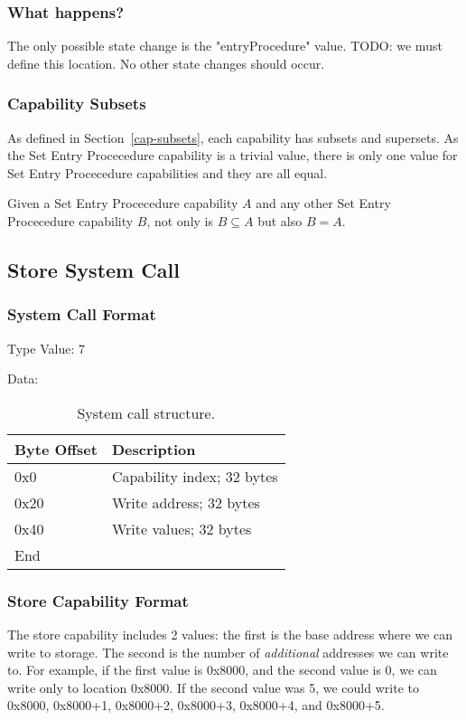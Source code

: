 \documentclass[english,a4paper]{article}
\let\oldparagraph\subsubsection
\renewcommand{\subsubsection}[1]{\oldparagraph{#1}\mbox{}}
\begin{document}
\subsubsection{What happens?}
The only possible state change is the "entryProcedure" value. TODO: we must
define this location. No other state changes should occur.

\subsubsection{Capability Subsets}
As defined in Section~\ref{cap-subsets}, each capability has subsets and
supersets. As the Set Entry Procecedure capability is a trivial value, there is
only one value for Set Entry Procecedure capabilities and they are all equal.

Given a Set Entry Procecedure capability $A$ and any other Set Entry Procecedure
capability $B$, not only is $B \subseteq A$ but also $B = A$.

\subsection{Store System Call}

\subsubsection{System Call Format}
Type Value: 7

Data:

\begin{table}[H]
  \caption{System call structure.}
  \centering{}%
  \begin{tabular}{l|p{}}
    \hline
    Byte Offset & Description\tabularnewline
    \hline
    \hline
    0x0 & Capability index; 32 bytes \tabularnewline
    0x20 & Write address; 32 bytes \tabularnewline
    0x40 & Write values; 32 bytes \tabularnewline
    \hline
    End &  \tabularnewline
    \hline
  \end{tabular}
\end{table}

\subsubsection{Store Capability Format}
The store capability includes 2 values: the first is the base address where we
can write to storage. The second is the number of \emph{additional} addresses we
can write to. For example, if the first value is 0x8000, and the second value is
0, we can write only to location 0x8000. If the second value was 5, we could
write to 0x8000, 0x8000+1, 0x8000+2, 0x8000+3, 0x8000+4, and 0x8000+5.
\end{document}
